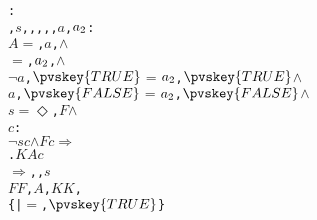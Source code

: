 \begin{alltt}
  : 
     \pvsid{(}, \(s\), , , , , \(a\), \(a\sb{2}\)\pvsid{)}:
      \pvsid{(}\pvsid{(}\(A\)\pvsid{(}\pvsid{)} \(=\) \pvsid{(}\pvsid{(}, \(a\)\pvsid{)}, \pvsid{)} \(\wedge\)
            \(=\) \pvsid{(}\pvsid{(}, \(a\sb{2}\)\pvsid{)}, \pvsid{)} \(\wedge\)
            \(\neg\) \pvsid{(}\(a\), \({\pvskey{TRUE}}\)\pvsid{)} \(=\) \pvsid{(}\(a\sb{2}\), \({\pvskey{TRUE}}\)\pvsid{)} \(\wedge\)
             \pvsid{(}\(a\), \({\pvskey{FALSE}}\)\pvsid{)} \(=\) \pvsid{(}\(a\sb{2}\), \({\pvskey{FALSE}}\)\pvsid{)} \(\wedge\)
              \(s\) \(=\) \(\Diamond\) \pvsid{(}\pvsid{(}\pvsid{)}, \(F\)\pvsid{(}\pvsid{)}\pvsid{)} \(\wedge\)
               \pvsid{(} \(c\):
                   \pvsid{(}\(\neg\) \(s\)\pvsid{(}\(c\)\pvsid{)} \(\wedge\) \pvsid{(}\(F\)\pvsid{(}\pvsid{)}\pvsid{)}\pvsid{(}\(c\)\pvsid{)}\pvsid{)} \(\Rightarrow\)
                    .\pvsid{(}\pvsid{(}\(K\)\pvsid{(}\pvsid{)}\pvsid{)}\pvsid{(}\(A\)\pvsid{(}\pvsid{)}\pvsid{)}\pvsid{(}\(c\)\pvsid{)}\pvsid{)}\pvsid{)}\pvsid{)}
         \(\Rightarrow\) \pvsid{(}, , \(s\)\pvsid{)}\pvsid{)}
          \pvskey{=} \pvsid{(\#}\(F\) \pvskey{:=} \(F\)\pvsid{(}\pvsid{)}, \(A\) \pvskey{:=} , \(K\) \pvskey{:=} \(K\)\pvsid{(}\pvsid{)}\pvsid{\#)},
               \pvskey{=} \{ | \pvsid{(}\pvsid{)} \(=\) \pvsid{(}, \({\pvskey{TRUE}}\)\pvsid{)}\}\vspace*{\pvsdeclspacing}

  \end{alltt}
